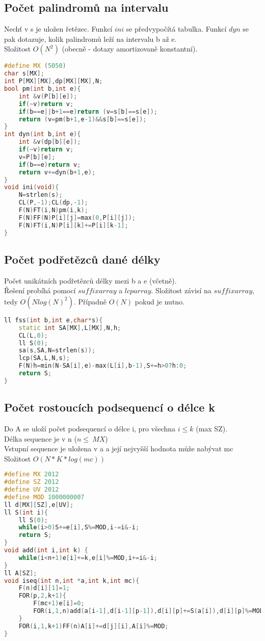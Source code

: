 \documentclass[11pt]{article}
\begin{document}
\subsection{Počet palindromů na intervalu}
Nechť v \textsf{s} je uložen řetězec. Funkcí $ini$ se předvypočítá tabulka. Funkcí $dyn$ se pak dotazuje, kolik palindromů leží na intervalu \textsf{b} až \textsf{e}.
\\Složitost $O(N^2)$ (obecně - dotazy amortizovaně konstantní).
\begin{lstlisting}[language=C++]
#define MX (5050)
char s[MX];
int P[MX][MX],dp[MX][MX],N;
bool pm(int b,int e){
    int &v(P[b][e]);
    if(~v)return v;
    if(b==e||b+1==e)return (v=s[b]==s[e]);
    return (v=pm(b+1,e-1)&&s[b]==s[e]);
}
int dyn(int b,int e){
    int &v(dp[b][e]);
    if(~v)return v;
    v=P[b][e];
    if(b==e)return v;
    return v+=dyn(b+1,e);
}
void ini(void){
	N=strlen(s);
    CL(P,-1);CL(dp,-1);
    F(N)FT(i,N)pm(i,k);
    F(N)FF(N)P[i][j]=max(0,P[i][j]);
    F(N)FT(i,N)P[i][k]+=P[i][k-1];
}
\end{lstlisting}
\subsection{Počet podřetězců dané délky}
Počet unikátních podřetězců délky mezi \textsf{b} a \textsf{e} (včetně).
\\Řešení probíhá pomocí $suffix array$ a $lcp array$. Složitost závisí na $suffix array$, tedy $O(Nlog(N)^2)$. Případně $O(N)$ pokud je nutno.
\begin{lstlisting}[language=C++]
ll fss(int b,int e,char*s){
    static int SA[MX],L[MX],N,h;
    CL(L,0);
    ll S(0);
    sa(s,SA,N=strlen(s));
    lcp(SA,L,N,s);
    F(N)h=min(N-SA[i],e)-max(L[i],b-1),S+=h>0?h:0;
    return S;
}
\end{lstlisting}
\subsection{Počet rostoucích podsequencí o délce k}
Do \textsf{A} se uloží počet podsequencí o délce \textsf{i}, pro všechna $i\leq k$ (max \textsf{SZ}).
\\Délka sequence je v \textsf{n} ($n\leq\ MX$)
\\Vstupní sequence je uložena v \textsf{a} a její nejvyšší hodnota může nabývat \textsf{mc}
\\Složitost $O(N*K*log(mc))$
\begin{lstlisting}[language=C++]
#define MX 2012
#define SZ 2012
#define UV 2012
#define MOD 1000000007
ll d[MX][SZ],e[UV];
ll S(int i){
    ll S(0);
    while(i>0)S+=e[i],S%=MOD,i-=i&-i;
    return S;
}
void add(int i,int k) {
    while(i<n+1)e[i]+=k,e[i]%=MOD,i+=i&-i;
}
ll A[SZ];
void iseq(int n,int *a,int k,int mc){
    F(n)d[i][1]=1;
    FOR(p,2,k+1){
        F(mc+1)e[i]=0;
        FOR(i,1,n)add(a[i-1],d[i-1][p-1]),d[i][p]+=S(a[i]),d[i][p]%=MOD;
    }
    FOR(i,1,k+1)FF(n)A[i]+=d[j][i],A[i]%=MOD;
}

\end{lstlisting}
\end{document}
